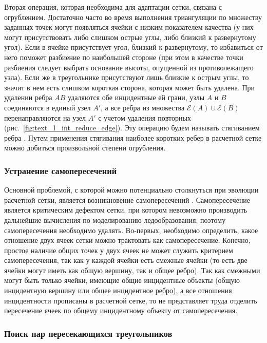 Вторая операция, которая необходима для адаптации сетки, связана с огрублением.
Достаточно часто во время выполнения триангуляции по множеству заданных точек могут появляться ячейки с низким показателем качества (у них могут присутствовать либо слишком острые углы, либо близкий к развернутому угол).
Если в ячейке присутствует угол, близкий к развернутому, то избавиться от него поможет разбиение по наибольшей стороне (при этом в качестве точки разбиения следует выбрать основание высоты, опущенной из противолежащего узла).
Если же в треугольнике присутствуют лишь близкие к острым углы, то значит в нем есть слишком короткая сторона, которая может быть удалена.
При удалении ребра $AB$ удаляются обе инцидентные ей грани, узлы $A$ и $B$ соединяются в единый узел $A'$, а все ребра из множества $\mathscr{E}(A) \cup \mathscr{E}(B)$ перенаправляются на узел $A'$ с учетом удаления повторных (рис.~\ref{fig:text_1_int_reduce_edge}).
Эту операцию будем называть стягиванием ребра \cite{Panchal2022Tri}.
Путем применения стягивания наиболее коротких ребер в расчетной сетке можно добиться произвольной степени огрубления.


\subsubsection{Устранение самопересечений}

Основной проблемой, с которой можно потенциально столкнуться при эволюции расчетной сетки, является возникновение самопересечений \cite{Freylekhman2022GeoIntersect}.
Самопересечение является критическим дефектом сетки, при котором невозможно производить дальнейшие вычисления по моделированию ледообразования, поэтому самопересечения необходимо удалять.
Во-первых, необходимо определить, какое отношение двух ячеек сетки можно трактовать как самопересечение.
Конечно, простое наличие общих точек у двух ячеек не может служить критерием самопересечения, так как у каждой ячейки есть смежные ячейки (то есть две ячейки могут иметь как общую вершину, так и общее ребро).
Так как смежными могут быть только ячейки, имеющие общие инцидентные объекты (общую инцидентную вершину или общее инцидентное ребро), а все отношения инцидентности прописаны в расчетной сетке, то не представляет труда отделить пересечение ячеек по общему инцидентному объекту от самопересечения.

\subsubsection{Поиск пар пересекающихся треугольников}

